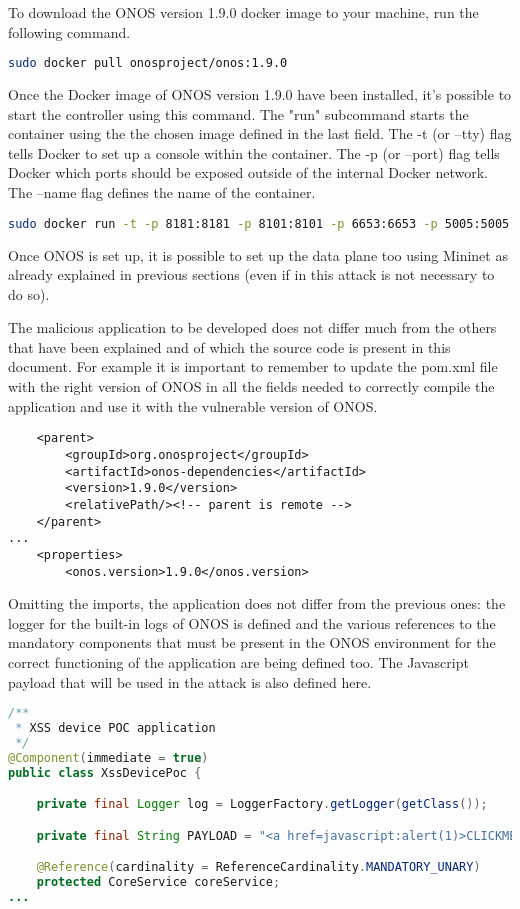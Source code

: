 \documentclass[a4paper,10pt]{memoir}
\begin{document}
To download the ONOS version 1.9.0 docker image to your machine, run the following command.
\begin{lstlisting}[language=bash]
sudo docker pull onosproject/onos:1.9.0
\end{lstlisting}

Once the Docker image of ONOS version 1.9.0 have been installed, it's possible to start the controller using this command. The "run" subcommand starts the container using the the chosen image defined in the last field. The -t (or --tty) flag tells Docker to set up a console within the container. The -p (or --port) flag tells Docker which ports should be exposed outside of the internal Docker network. The --name flag defines the name of the container.
\begin{lstlisting}[language=bash]
sudo docker run -t -p 8181:8181 -p 8101:8101 -p 6653:6653 -p 5005:5005 -p 830:830 --name onos onosproject/onos:1.9.0
\end{lstlisting}

Once ONOS is set up, it is possible to set up the data plane too using Mininet as already explained in previous sections (even if in this attack is not necessary to do so).
\medskip

The malicious application to be developed does not differ much from the others that have been explained and of which the source code is present in this document. For example it is important to remember to update the pom.xml file with the right version of ONOS in all the fields needed to correctly compile the application and use it with the vulnerable version of ONOS.
\begin{lstlisting}
    <parent>
        <groupId>org.onosproject</groupId>
        <artifactId>onos-dependencies</artifactId>
        <version>1.9.0</version>
        <relativePath/><!-- parent is remote -->
    </parent>
...
    <properties>
        <onos.version>1.9.0</onos.version>
\end{lstlisting}

Omitting the imports, the application does not differ from the previous ones: the logger for the built-in logs of ONOS is defined and the various references to the mandatory components that must be present in the ONOS environment for the correct functioning of the application are being defined too. The Javascript payload that will be used in the attack is also defined here.
\begin{lstlisting}[language=java,firstnumber=41]
/**
 * XSS device POC application
 */
@Component(immediate = true)
public class XssDevicePoc {

    private final Logger log = LoggerFactory.getLogger(getClass());

    private final String PAYLOAD = "<a href=javascript:alert(1)>CLICKME</a>";

    @Reference(cardinality = ReferenceCardinality.MANDATORY_UNARY)
    protected CoreService coreService;
...
\end{lstlisting}
\end{document}
